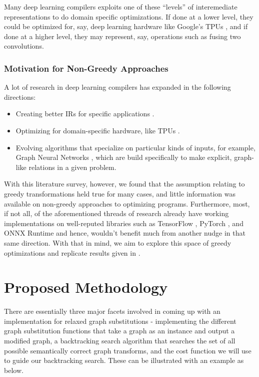 \documentclass[12pt,a4paper,twoside,openright,bibliography=totocnumbered]{report}
\begin{document}
Many deep learning compilers \cite{hloir} \cite{halideir} exploits one of these ``levels'' of interemediate representations to do domain specific optimizations. If done at a lower level, they could be optimized for, say, deep learning hardware like Google's TPUs \cite{jouppi2017datacenter}, and if done at a higher level, they may represent, say, operations such as fusing two convolutions.


\subsection{Motivation for Non-Greedy Approaches}
A lot of research in deep learning compilers has expanded in the following directions:
\begin{itemize}
	\item Creating better IRs for specific applications \cite{li2020deep}.
	\item Optimizing for domain-specific hardware, like TPUs \cite{li2020deep}.
	\item Evolving algorithms that specialize on particular kinds of inputs, for example, Graph Neural Networks \cite{wu2024hector}, which are build specifically to make explicit, graph-like relations in a given problem. 
\end{itemize}

With this literature survey, however, we found that the assumption relating to greedy transformations held true for many cases, and little information was available on non-greedy approaches to optimizing programs. Furthermore, most, if not all, of the aforementioned threads of research already have working implementations on well-reputed libraries such as TensorFlow \cite{tf2016}, PyTorch \cite{pytorchdocs}, and ONNX Runtime \cite{onnxoptimizer} and hence, wouldn't benefit much from another nudge in that same direction. With that in mind, we aim to explore this space of greedy optimizations and replicate results given in \cite{jia2019}.

\chapter{Proposed Methodology}

There are essentially three major facets involved in coming up with an implementation for relaxed graph substitutions - implementing the different graph substitution functions that take a graph as an instance and output a modified graph, a backtracking search algorithm that searches the set of all possible semantically correct graph transforms, and the cost function we will use to guide our backtracking search. These can be illustrated with an example as below.
\end{document}
